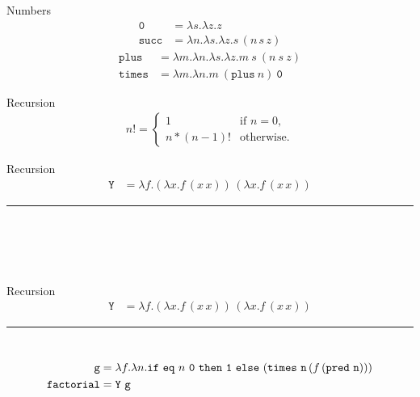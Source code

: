 \documentclass{beamer}
\newcommand{\mkw}[1]{{\bf \mathtt{#1}}}
\newcommand{\msym}[1]{\mathtt{#1}}
\newcommand{\hr}[0]{\rule{10.75cm}{0.4pt}\\}
\begin{document}
\begin{frame}{Numbers}
\begin{align*}
\msym{0}    &= \lambda s.\lambda z.z \\
\msym{succ} &= \lambda n.\lambda s.\lambda z.s\,(n\,s\,z)
\end{align*}
\begin{align*}
\msym{plus}  &= \lambda m.\lambda n.\lambda s. \lambda z.m\ s\ (n\ s\ z) \\
\msym{times} &= \lambda m.\lambda n.m\ (\msym{plus}\ n)\ \msym{0}
\end{align*}
\end{frame}
\begin{frame}{Recursion}
\begin{align*}
n!=\begin{cases}
    1 & \text{if $n=0$},\\
    n*(n-1)! & \text{otherwise}.
  \end{cases}
\end{align*}
\end{frame}
\begin{frame}{Recursion}
\begin{align*}
\msym{Y} &= \lambda f.(\lambda x.f\,(x\,x))\,(\lambda x.f\,(x\,x))
\end{align*}
\hr
\begin{align*}
\phantom{\msym{g} = \lambda f.\lambda
n.\mkw{if}\ \msym{eq}\ n\ \msym{0}\ \mkw{then}\ \msym{1}\ \mkw{else}\ (\msym{times}\ \msym{n}\,(f\,(\msym{pred}\ \msym{n})))} \\
\phantom{\msym{factorial} = \msym{Y}\ \msym{g}}
\end{align*}
\end{frame}
\begin{frame}{Recursion}
\begin{align*}
\msym{Y} &= \lambda f.(\lambda x.f\,(x\,x))\,(\lambda x.f\,(x\,x))
\end{align*}
\hr
\begin{align*}
\msym{g} &= \lambda f.\lambda
n.\mkw{if}\ \msym{eq}\ n\ \msym{0}\ \mkw{then}\ \msym{1}\ \mkw{else}\ (\msym{times}\ \msym{n}\,(f\,(\msym{pred}\ \msym{n}))) \\
\msym{factorial} &= \msym{Y}\ \msym{g}
\end{align*}
\end{frame}
\end{document}
